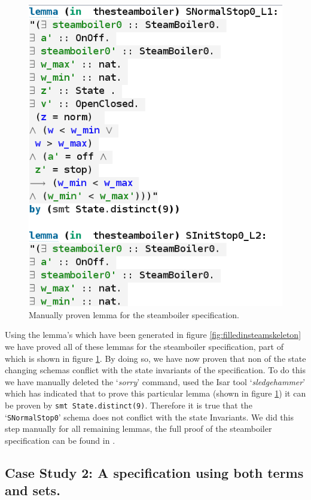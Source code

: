 \begin{figure}[H]
\includegraphics[scale=0.5]{Figures/Evaluation/6image.png}
\caption{Manually proven lemma for the steamboiler specification. \label{fig:steamboilerproof}}
\end{figure}

Using the lemma's which have been generated in figure
\ref{fig:filledinsteamskeleton} we have proved all of these lemmas for the
steamboiler specification, part of which is shown in figure
\ref{fig:steamboilerproof}. By doing so, we have now proven that non of the
state changing schemas conflict with the state invariants of the specification.
To do this we have manually deleted the `\emph{sorry}' command, used the Isar
tool `\emph{sledgehammer}' which has indicated that to prove this particular
lemma (shown in figure \ref{fig:steamboilerproof}) it can be proven by
\verb|smt State.distinct(9)|.
Therefore it is true that the `\texttt{SNormalStop0}' schema
does not conflict with the state Invariants. We did this step manually for all
remaining lemmas, the full proof of the steamboiler specification can be found
in \cite{mathlangexamples}.

\subsection{Case Study 2: A specification using both terms and sets.}

